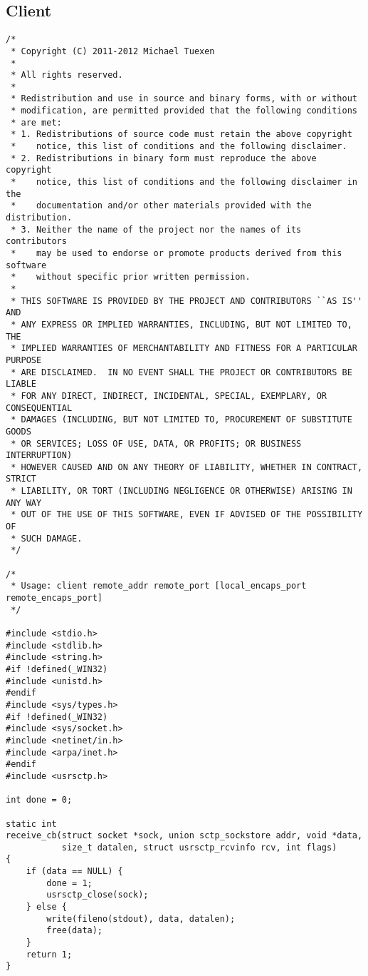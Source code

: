 \documentclass[a4paper]{article}
\begin{document}
\subsection{Client}\label{client}
\begin{verbatim}
/*
 * Copyright (C) 2011-2012 Michael Tuexen
 *
 * All rights reserved.
 *
 * Redistribution and use in source and binary forms, with or without
 * modification, are permitted provided that the following conditions
 * are met:
 * 1. Redistributions of source code must retain the above copyright
 *    notice, this list of conditions and the following disclaimer.
 * 2. Redistributions in binary form must reproduce the above copyright
 *    notice, this list of conditions and the following disclaimer in the
 *    documentation and/or other materials provided with the distribution.
 * 3. Neither the name of the project nor the names of its contributors
 *    may be used to endorse or promote products derived from this software
 *    without specific prior written permission.
 *
 * THIS SOFTWARE IS PROVIDED BY THE PROJECT AND CONTRIBUTORS ``AS IS'' AND
 * ANY EXPRESS OR IMPLIED WARRANTIES, INCLUDING, BUT NOT LIMITED TO, THE
 * IMPLIED WARRANTIES OF MERCHANTABILITY AND FITNESS FOR A PARTICULAR PURPOSE
 * ARE DISCLAIMED.	IN NO EVENT SHALL THE PROJECT OR CONTRIBUTORS BE LIABLE
 * FOR ANY DIRECT, INDIRECT, INCIDENTAL, SPECIAL, EXEMPLARY, OR CONSEQUENTIAL
 * DAMAGES (INCLUDING, BUT NOT LIMITED TO, PROCUREMENT OF SUBSTITUTE GOODS
 * OR SERVICES; LOSS OF USE, DATA, OR PROFITS; OR BUSINESS INTERRUPTION)
 * HOWEVER CAUSED AND ON ANY THEORY OF LIABILITY, WHETHER IN CONTRACT, STRICT
 * LIABILITY, OR TORT (INCLUDING NEGLIGENCE OR OTHERWISE) ARISING IN ANY WAY
 * OUT OF THE USE OF THIS SOFTWARE, EVEN IF ADVISED OF THE POSSIBILITY OF
 * SUCH DAMAGE.
 */

/*
 * Usage: client remote_addr remote_port [local_encaps_port remote_encaps_port]
 */

#include <stdio.h>
#include <stdlib.h>
#include <string.h>
#if !defined(_WIN32)
#include <unistd.h>
#endif
#include <sys/types.h>
#if !defined(_WIN32)
#include <sys/socket.h>
#include <netinet/in.h>
#include <arpa/inet.h>
#endif
#include <usrsctp.h>

int done = 0;

static int
receive_cb(struct socket *sock, union sctp_sockstore addr, void *data,
           size_t datalen, struct usrsctp_rcvinfo rcv, int flags)
{
    if (data == NULL) {
        done = 1;
        usrsctp_close(sock);
    } else {
        write(fileno(stdout), data, datalen);
        free(data);
    }
    return 1;
}


\end{verbatim}
\end{document}
